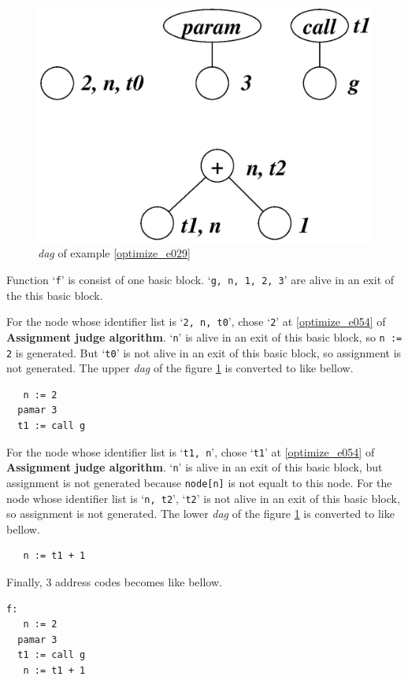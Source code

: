 \begin{Example}
\begin{figure}[htbp]
\begin{center}
\begin{latexonly}
\includegraphics[width=0.8\linewidth,height=0.571\linewidth]{opt013.eps}
\end{latexonly}
\caption{{\em dag} of example \ref{optimize_e029}}
\label{optimize_e030}
\end{center}
\end{figure}
Function `{\tt{f}}' is consist of one basic block.
`{\tt{g, n, 1, 2, 3}}' are alive in an exit of the this basic block.

For the node whose identifier list is `{\tt{2, n, t0}}',
chose `{\tt{2}}' at \ref{optimize_e054} of {\bf Assignment judge
 algorithm}.
`{\tt{n}}' is alive in an exit of this basic block, so
{\tt{n := 2}} is generated. But
`{\tt{t0}}' is not alive in an exit of this basic block, so
assignment is not generated.
The upper {\em dag} of the figure \ref{optimize_e030} 
is converted to like bellow.
\begin{verbatim}
   n := 2
  pamar 3
  t1 := call g
\end{verbatim}
For the node whose identifier list is `{\tt{t1, n}}',
chose `{\tt{t1}}' at \ref{optimize_e054} of {\bf Assignment judge
 algorithm}.
`{\tt{n}}' is alive in an exit of this basic block, but
assignment is not generated because {\tt{node[n]}} is
not equalt to this node.
For the node whose identifier list is `{\tt{n, t2}}',
`{\tt{t2}}' is not alive in an exit of this basic block, 
so assignment is not generated.
The lower {\em dag} of the figure \ref{optimize_e030} 
is converted to like bellow.
\begin{verbatim}
   n := t1 + 1
\end{verbatim}
Finally, 3 address codes becomes like bellow.
\begin{verbatim}
f:
   n := 2
  pamar 3
  t1 := call g
   n := t1 + 1
\end{verbatim}
\end{Example}

